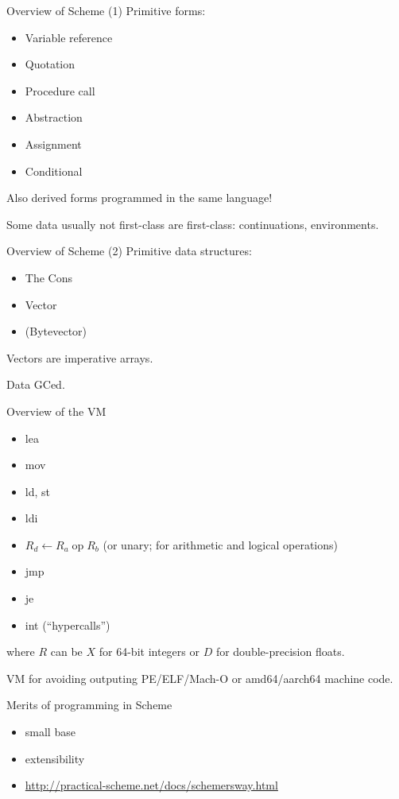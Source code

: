 \documentclass{beamer}
\begin{document}
\begin{frame}{Overview of Scheme (1)}
  Primitive forms:
  \begin{itemize}
  \item Variable reference
  \item Quotation
  \item Procedure call
  \item Abstraction
  \item Assignment
  \item Conditional
  \end{itemize}

  Also derived forms programmed in the same language!

  Some data usually not first-class are first-class: continuations, environments. 
\end{frame}

\begin{frame}{Overview of Scheme (2)}
  Primitive data structures:
  \begin{itemize}
  \item The Cons
  \item Vector
  \item (Bytevector)
  \end{itemize}

  Vectors are imperative arrays.

  Data GCed.
\end{frame}

\begin{frame}{Overview of the VM}
  \begin{itemize}
  \item lea
  \item mov
  \item ld, st
  \item ldi
  \item $R_d\gets R_a\operatorname{op}R_b$ (or unary; for arithmetic and logical operations)
  \item jmp
  \item je
  \item int (``hypercalls'')
  \end{itemize}
  where $R$ can be $X$ for 64-bit integers or $D$ for double-precision floats.
  
  VM for avoiding outputing PE/ELF/Mach-O or amd64/aarch64 machine code.
\end{frame}

\begin{frame}{Merits of programming in Scheme}
  \begin{itemize}
  \item small base
  \item extensibility
  \item \url{http://practical-scheme.net/docs/schemersway.html}
  \end{itemize}
\end{frame}
\end{document}
